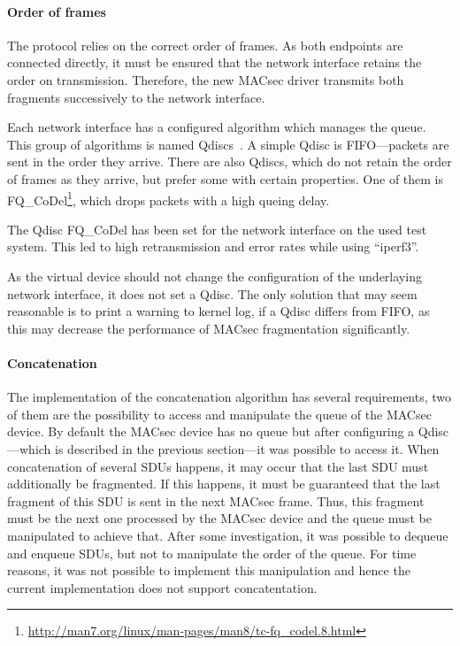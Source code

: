 \paragraph{Order of frames}
\label{par:frame-order}
The protocol relies on the correct order of frames.
As both endpoints are connected directly, it must be ensured that the network interface retains the order on transmission.
Therefore, the new \gls{MACsec} driver transmits both fragments successively to the network interface.

Each network interface has a configured algorithm which manages the queue.
This group of algorithms is named \glspl{Qdisc}~\cite{hubert2002linux}.
A simple \gls{Qdisc} is \gls{FIFO}---packets are sent in the order they arrive.
There are also \glspl{Qdisc}, which do not retain the order of frames as they arrive, but prefer some with certain properties.
One of them is FQ\_CoDel\footnote{\url{http://man7.org/linux/man-pages/man8/tc-fq_codel.8.html}}, which drops packets with a high queing delay.

The \gls{Qdisc} FQ\_CoDel has been set for the network interface on the used test system.
This led to high retransmission and error rates while using ``iperf3''.

As the virtual device should not change the configuration of the underlaying network interface, it does not set a \gls{Qdisc}.
The only solution that may seem reasonable is to print a warning to kernel log, if a \gls{Qdisc} differs from \gls{FIFO}, as this may decrease the performance of \gls{MACsec} fragmentation significantly.

\paragraph{Concatenation}
The implementation of the concatenation algorithm has several requirements, two of them are the possibility to access and manipulate the queue of the \gls{MACsec} device.
By default the \gls{MACsec} device has no queue but after configuring a \gls{Qdisc}---which is described in the previous section---it was possible to access it.
When concatenation of several \glspl{SDU} happens, it may occur that the last \gls{SDU} must additionally be fragmented.
If this happens, it must be guaranteed that the last fragment of this \gls{SDU} is sent in the next \gls{MACsec} frame.
Thus, this fragment must be the next one processed by the \gls{MACsec} device and the queue must be manipulated to achieve that.
After some investigation, it was possible to dequeue and enqueue \glspl{SDU}, but not to manipulate the order of the queue.
For time reasons, it was not possible to implement this manipulation and hence the current implementation does not support concatentation.

